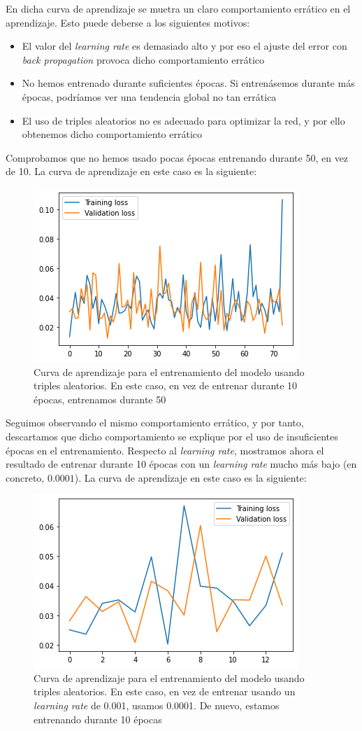 \documentclass[11pt]{article}
\begin{document}
En dicha curva de aprendizaje se muetra un claro comportamiento errático en el aprendizaje. Esto puede deberse a los siguientes motivos:

\begin{itemize}
  \item El valor del \emph{learning rate} es demasiado alto y por eso el ajuste del error con \emph{back propagation} provoca dicho comportamiento errático
  \item No hemos entrenado durante suficientes épocas. Si entrenásemos durante más épocas, podríamos ver una tendencia global no tan errática
  \item El uso de triples aleatorios no es adecuado para optimizar la red, y por ello obtenemos dicho comportamiento errático
\end{itemize}

Comprobamos que no hemos usado pocas épocas entrenando durante 50, en vez de 10. La curva de aprendizaje en este caso es la siguiente:

\begin{figure}[H]
    \centering
    \includegraphics[width = 0.4 \textwidth]{random_curva_aprendizaje_larga}
    \caption{Curva de aprendizaje para el entrenamiento del modelo usando triples aleatorios. En este caso, en vez de entrenar durante 10 épocas, entrenamos durante 50}
\end{figure}

Seguimos observando el mismo comportamiento errático, y por tanto, descartamos que dicho comportamiento se explique por el uso de insuficientes épocas en el entrenamiento. Respecto al \emph{learning rate}, mostramos ahora el resultado de entrenar durante 10 épocas con un \emph{learning rate} mucho más bajo (en concreto, $0.0001$). La curva de aprendizaje en este caso es la siguiente:

\begin{figure}[H]
    \centering
    \includegraphics[width = 0.4 \textwidth]{random_curva_aprendizaje_lrbajo}
    \caption{Curva de aprendizaje para el entrenamiento del modelo usando triples aleatorios. En este caso, en vez de entrenar usando un \emph{learning rate} de 0.001, usamos 0.0001. De nuevo, estamos entrenando durante 10 épocas}
\end{figure}
\end{document}
